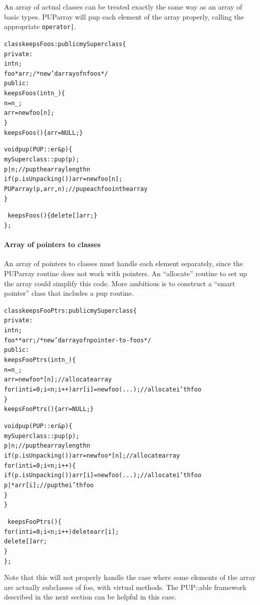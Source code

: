An array of actual classes can be treated exactly the same way
as an array of basic types.  PUParray will pup each 
element of the array properly, calling the appropriate \verb.operator|..
\begin{alltt}
class keepsFoos : public mySuperclass \{
private:
    int n;
    foo *arr;/*new'd array of n foos*/
public:
    keepsFoos(int n_) \{
      n=n_;
      arr=new foo[n];
    \}
    keepsFoos() \{ arr=NULL; \} 
    
    void pup(PUP::er &p) \{
      mySuperclass::pup(p);
      p|n;//pup the array length n
      if (p.isUnpacking())  arr=new foo[n];
      PUParray(p,arr,n); //pup each foo in the array
    \}
    
    ~keepsFoos() \{delete[] arr;\}
\};
\end{alltt}


\paragraph{Array of pointers to classes}

An array of pointers to classes must handle each element
separately, since the PUParray routine does not work with 
pointers.  An ``allocate'' routine to set up the array
could simplify this code.  More ambitious is to construct
a ``smart pointer'' class that includes a pup routine.
\begin{alltt}
class keepsFooPtrs : public mySuperclass \{
private:
    int n;
    foo **arr;/*new'd array of n pointer-to-foos*/
public:
    keepsFooPtrs(int n_) \{
      n=n_;
      arr=new foo*[n]; // allocate array
      for (int i=0;i<n;i++) arr[i]=new foo(...); // allocate i'th foo
    \}
    keepsFooPtrs() \{ arr=NULL; \} 
    
    void pup(PUP::er &p) \{
      mySuperclass::pup(p);
      p|n;//pup the array length n
      if (p.isUnpacking()) arr=new foo*[n]; // allocate array
      for (int i=0;i<n;i++) \{
        if (p.isUnpacking()) arr[i]=new foo(...); // allocate i'th foo
        p|*arr[i];  //pup the i'th foo
      \}
    \}
    
    ~keepsFooPtrs() \{
       for (int i=0;i<n;i++) delete arr[i];
       delete[] arr;
     \}
\};
\end{alltt}

Note that this will not properly handle the case where
some elements of the array are actually subclasses of foo,
with virtual methods.  The PUP::able framework described
in the next section can be helpful in this case.


